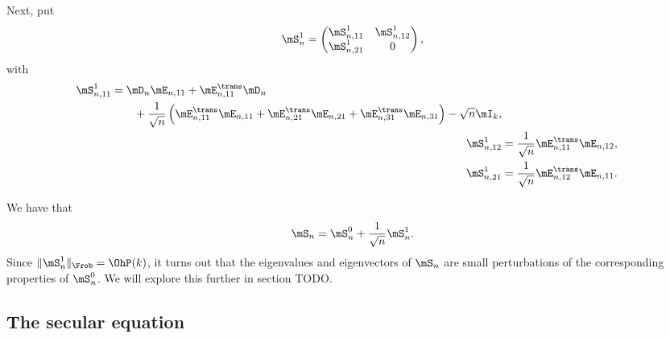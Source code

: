 Next, put
\[
    \mS_n^1
    =
    \left(
    \begin{matrix}
        \mS_{n,11}^1 & \mS_{n,12}^1 \\
        \mS_{n,21}^1 & 0
    \end{matrix}
    \right),
\]
with
\begin{align*} 
    \begin{split}   
    \mS_{n,11}^1
        &=
            \mD_n \mE_{n,11}
            +
            \mE_{n,11}^\trans \mD_n \\
            &\qquad +
            \frac{1}{\sqrt{n}} 
            \left(
                \mE_{n,11}^\trans \mE_{n,11}
                +
                \mE_{n,21}^\trans \mE_{n,21}
                +
                \mE_{n,31}^\trans \mE_{n,31}
            \right)
            -
            \sqrt{n} \mI_k,
    \end{split} \\
    \mS_{n,12}^1
        &= \frac{1}{\sqrt{n}} \mE_{n,11}^\trans \mE_{n,12}, \\
    \mS_{n,21}^1
        &= \frac{1}{\sqrt{n}} \mE_{n,12}^\trans \mE_{n,11}.
\end{align*}

We have that
\[
    \mS_n = \mS_n^0 + \frac{1}{\sqrt{n}} \mS_n^1.
\]
Since $\| \mS_n^1 \|_\Frob = \OhP( k )$,
it turns out that the eigenvalues and eigenvectors of $\mS_n$ are small
perturbations of the corresponding properties of $\mS_n^0$.  We will explore this further in section TODO.

\subsection{The secular equation}

